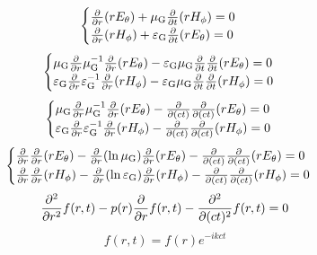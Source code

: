\begin{equation}
    \begin{cases}
        \frac{\partial}{\partial r}(r{E}_\theta)+\mu_{\text{G}}\frac{\partial}{\partial t}(r{H}_\phi)=0\\
        \frac{\partial}{\partial r}(r{H}_\phi)+\varepsilon_{\text{G}}\frac{\partial}{\partial t}(r{E}_\theta)=0\\
    \end{cases}
\end{equation}
\begin{equation}
    \begin{cases}
        \mu_{\text{G}}\frac{\partial}{\partial r}\mu_{\text{G}}^{-1}\frac{\partial}{\partial r}(r{E}_\theta)-\varepsilon_{\text{G}}\mu_{\text{G}}\frac{\partial}{\partial t}\frac{\partial}{\partial t}(r{E}_\theta)=0\\
        \varepsilon_{\text{G}}\frac{\partial}{\partial r}\varepsilon_{\text{G}}^{-1}\frac{\partial}{\partial r}(r{H}_\phi)-\varepsilon_{\text{G}}\mu_{\text{G}}\frac{\partial}{\partial t}\frac{\partial}{\partial t}(r{H}_\phi)=0\\
    \end{cases}
\end{equation}
\begin{equation}
    \begin{cases}
        \mu_{\text{G}}\frac{\partial}{\partial r}\mu_{\text{G}}^{-1}\frac{\partial}{\partial r}(r{E}_\theta)-\frac{\partial}{\partial(ct)}\frac{\partial}{\partial(ct)}(r{E}_\theta)=0\\
        \varepsilon_{\text{G}}\frac{\partial}{\partial r}\varepsilon_{\text{G}}^{-1}\frac{\partial}{\partial r}(r{H}_\phi)-\frac{\partial}{\partial(ct)}\frac{\partial}{\partial(ct)}(r{H}_\phi)=0\\
    \end{cases}
\end{equation}
\begin{equation}
    \begin{cases}
        \frac{\partial}{\partial r}\frac{\partial}{\partial r}(r{E}_\theta)-\frac{\partial}{\partial r}(\ln\mu_{\text{G}})\frac{\partial}{\partial r}(r{E}_\theta)-\frac{\partial}{\partial(ct)}\frac{\partial}{\partial(ct)}(r{E}_\theta)=0\\
        \frac{\partial}{\partial r}\frac{\partial}{\partial r}(r{H}_\phi)-\frac{\partial}{\partial r}(\ln\varepsilon_{\text{G}})\frac{\partial}{\partial r}(r{H}_\phi)-\frac{\partial}{\partial(ct)}\frac{\partial}{\partial(ct)}(r{H}_\phi)=0\\
    \end{cases}
\end{equation}
\begin{equation}
    \frac{\partial^2}{\partial r^2}f(r,t)-p(r)\frac{\partial}{\partial r}f(r,t)-\frac{\partial^2}{\partial (ct)^2}f(r,t)=0
\end{equation}
\begin{equation}
    f(r,t)=f(r)e^{-ikct}
\end{equation}
